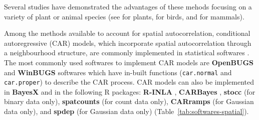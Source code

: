 \documentclass[a4paper, 12pt, leqno]{article}\usepackage[]{graphicx}\usepackage[]{color}
\begin{document}
Several studies have demonstrated the advantages of these mehods focusing on a variety of
plant or animal species (see \citet{Latimer2006,Gelfand2005,Kuhn2006} for plants,
\citet{Lichstein2002} for birds, and \citet{Poley2014,Johnson2013} for mammals).

Among the methods available to account for spatial autocorrelation, conditional
autoregressive (CAR) models, which incorporate spatial autocorrelation through a
neighbourhood structure, are commonly implemented in statistical softwares
\citep{Dormann2007}. The most commonly used softwares to implement CAR models are
\textbf{OpenBUGS} and \textbf{WinBUGS} softwares \citep{Lunn2009} which have in-built
functions (\texttt{car.normal} and \texttt{car.proper}) to describe the CAR process. CAR
models can also be implemented in \textbf{BayesX} \citep{Brezger2005} and in the following
R packages: \textbf{R-INLA} \citep{Rue2009}, \textbf{CARBayes} \citep{Lee2013},
\textbf{stocc} (for binary data only), \textbf{spatcounts} (for count data only),
\textbf{CARramps} (for Gaussian data only), and \textbf{spdep} (for Gaussian data only)
(Table~\ref{tab:softwares-spatial}).
\end{document}
